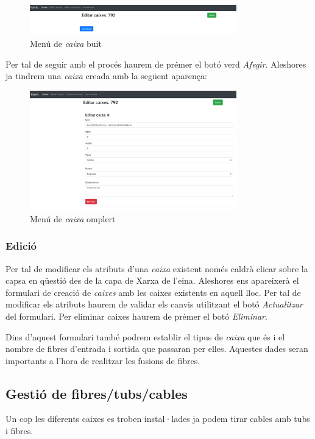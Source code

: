 \documentclass[a4paper]{article}
\begin{document}
	\begin{figure}[H]
		\centering
		\includegraphics[width=0.8\textwidth]{images/boxes_edit_void.png}
		\caption{Menú de \emph{caixa} buit}
	\end{figure}

	Per tal de seguir amb el procés haurem de prémer el botó verd \emph{Afegir}. Aleshores ja tindrem una \emph{caixa} creada amb la següent aparença:
	
	\begin{figure}[H]
		\centering
		\includegraphics[width=0.8\textwidth]{images/boxes_edit_full.png}
		\caption{Menú de \emph{caixa} omplert}
	\end{figure}

	
	\subsubsection{Edició}
	Per tal de modificar els atributs d'una \emph{caixa} existent només caldrà clicar sobre la capsa en qüestió des de la capa de Xarxa de l'eina. Aleshores ens apareixerà el formulari de creació de \emph{caixes} amb les caixes existents en aquell lloc. Per tal de modificar els atributs haurem de validar els canvis utilitzant el botó \emph{Actualitzar} del formulari. Per eliminar caixes haurem de prémer el botó \emph{Eliminar}.
	
	Dins d'aquest formulari també podrem establir el tipus de \emph{caixa} que és i el nombre de fibres d'entrada i sortida que passaran per elles. Aquestes dades seran importants a l'hora de realitzar les fusions de fibres.
	
	\subsection{Gestió de fibres/tubs/cables}
	Un cop les diferents caixes es troben instal·lades ja podem tirar cables amb tubs i fibres.
	
\end{document}
